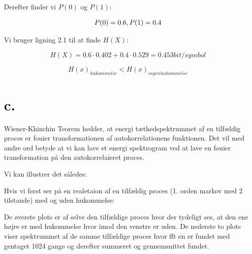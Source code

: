 Derefter finder vi $P(0)$ og $P(1)$:

\begin{equation}
P(0) = 0.6 \\,\\P(1) = 0.4
\end{equation}

Vi bruger ligning 2.1 til at finde $H(X)$:

 \begin{equation}
H(X) = 0.6\cdot 0.402+0.4 \cdot 0.529 = 0.453 bit/symbol
\end{equation} 



\begin{equation}
H(x)_{hukommelse}<H(x)_{ingen hukommelse}
\end{equation}



\section{c.}

Wiener-Khinchin Teorem hedder, at energi tæthedspektrummet af en tilfældig proces er fouier transformationen af autokorrelationens funktionen. Det vil med andre ord betyde at vi kan lave et energi spektrogram ved at lave en fouier transformation på den autokorrelaieret proces.
 
Vi kan illustrer det således:\\



Hvis vi først ser på en realetaion af en tilfældig proces (1. orden markov med 2 tilstande) med og uden hukommelse:

De øverste plots er af selve den tilfældige proces hvor der tydeligt ses, at den ene højre er med hukommelse hvor imod den venstre er uden. De nederste to plots viser spektrummet af de samme tilfældige proces hvor fft en er fundet med gentaget 1024 gange og derefter summeret og gennemsnittet fundet.

